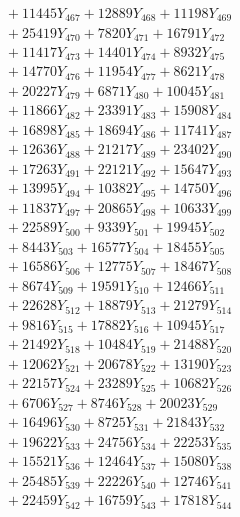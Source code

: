 \documentclass[a4paper,10pt]{article}
\begin{document}
{\begin{align}
&\;  + 11445 Y_{467} + 12889 Y_{468} + 11198 Y_{469} \\[0.3ex]
&\;  + 25419 Y_{470} + 7820 Y_{471} + 16791 Y_{472} \\[0.3ex]
&\;  + 11417 Y_{473} + 14401 Y_{474} + 8932 Y_{475} \\[0.3ex]
&\;  + 14770 Y_{476} + 11954 Y_{477} + 8621 Y_{478} \\[0.5ex]\allowbreak
&\;  + 20227 Y_{479} + 6871 Y_{480} + 10045 Y_{481} \\[0.3ex]
&\;  + 11866 Y_{482} + 23391 Y_{483} + 15908 Y_{484} \\[0.3ex]
&\;  + 16898 Y_{485} + 18694 Y_{486} + 11741 Y_{487} \\[0.3ex]
&\;  + 12636 Y_{488} + 21217 Y_{489} + 23402 Y_{490} \\[0.3ex]
&\;  + 17263 Y_{491} + 22121 Y_{492} + 15647 Y_{493} \\[0.3ex]
&\;  + 13995 Y_{494} + 10382 Y_{495} + 14750 Y_{496} \\[0.3ex]
&\;  + 11837 Y_{497} + 20865 Y_{498} + 10633 Y_{499} \\[0.3ex]
&\;  + 22589 Y_{500} + 9339 Y_{501} + 19945 Y_{502} \\[0.3ex]
&\;  + 8443 Y_{503} + 16577 Y_{504} + 18455 Y_{505} \\[0.3ex]
&\;  + 16586 Y_{506} + 12775 Y_{507} + 18467 Y_{508} \\[0.5ex]\allowbreak
&\;  + 8674 Y_{509} + 19591 Y_{510} + 12466 Y_{511} \\[0.3ex]
&\;  + 22628 Y_{512} + 18879 Y_{513} + 21279 Y_{514} \\[0.3ex]
&\;  + 9816 Y_{515} + 17882 Y_{516} + 10945 Y_{517} \\[0.3ex]
&\;  + 21492 Y_{518} + 10484 Y_{519} + 21488 Y_{520} \\[0.3ex]
&\;  + 12062 Y_{521} + 20678 Y_{522} + 13190 Y_{523} \\[0.3ex]
&\;  + 22157 Y_{524} + 23289 Y_{525} + 10682 Y_{526} \\[0.3ex]
&\;  + 6706 Y_{527} + 8746 Y_{528} + 20023 Y_{529} \\[0.3ex]
&\;  + 16496 Y_{530} + 8725 Y_{531} + 21843 Y_{532} \\[0.3ex]
&\;  + 19622 Y_{533} + 24756 Y_{534} + 22253 Y_{535} \\[0.3ex]
&\;  + 15521 Y_{536} + 12464 Y_{537} + 15080 Y_{538} \\[0.5ex]\allowbreak
&\;  + 25485 Y_{539} + 22226 Y_{540} + 12746 Y_{541} \\[0.3ex]
&\;  + 22459 Y_{542} + 16759 Y_{543} + 17818 Y_{544} \\[0.3ex]

\end{align}}
\end{document}
